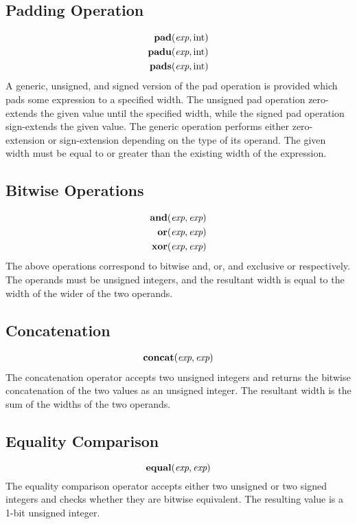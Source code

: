 \documentclass[12pt]{article}
\begin{document}
\subsection{Padding Operation}
\[
\begin{aligned}
\text{\bf pad}(\text{\em exp}, \text{int})     \\
\text{\bf padu}(\text{\em exp}, \text{int})     \\
\text{\bf pads}(\text{\em exp}, \text{int})     \\
\end{aligned}
\]
A generic, unsigned, and signed version of the pad operation is provided which pads some expression to a specified width. The unsigned pad operation zero-extends the given value until the specified width, while the signed pad operation sign-extends the given value. The generic operation performs either zero-extension or sign-extension depending on the type of its operand. The given width must be equal to or greater than the existing width of the expression. 

\subsection{Bitwise Operations}
\[
\begin{aligned}
\text{\bf and}(\text{\em exp}, \text{\em exp})     \\
\text{\bf or}(\text{\em exp}, \text{\em exp})     \\
\text{\bf xor}(\text{\em exp}, \text{\em exp})     \\
\end{aligned}
\]
The above operations correspond to bitwise and, or, and exclusive or respectively. The operands must be unsigned integers, and the resultant width is equal to the width of the wider of the two operands. 

\subsection{Concatenation}
\[
\begin{aligned}
\text{\bf concat}(\text{\em exp}, \text{\em exp})     \\
\end{aligned}
\]
The concatenation operator accepts two unsigned integers and returns the bitwise concatenation of the two values as an unsigned integer. The resultant width is the sum of the widths of the two operands.

\subsection{Equality Comparison}
\[
\text{\bf equal}(\text{\em exp}, \text{\em exp}) \\
\]
The equality comparison operator accepts either two unsigned or two signed integers and checks whether they are bitwise equivalent. The resulting value is a 1-bit unsigned integer. 
\end{document}
